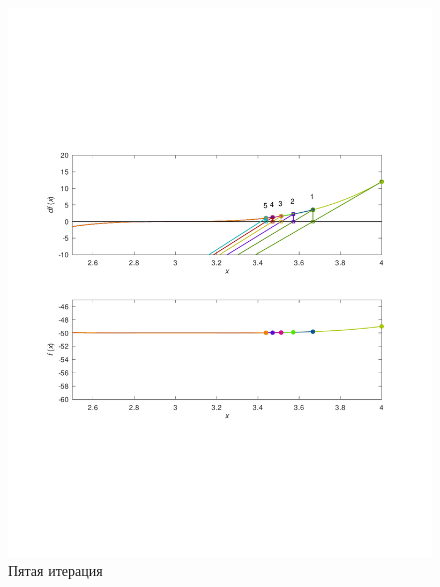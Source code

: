 \documentclass[a4paper,12pt]{article}
\begin{document}
    \begin{figure}[H]
        \centering
        \includegraphics[scale=0.4]{5secantitter.pdf}
        \caption{Пятая итерация}
    \end{figure}
\end{document}
